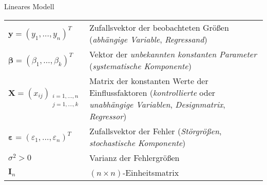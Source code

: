 \begin{defi}{Lineares Modell}
    \begin{tabularx}{\linewidth}{lX}
        $\mathbf{y} = (y_1, \ldots, y_n)^T$                                     & Zufallsvektor der beobachteten Größen (\emph{abhängige Variable}, \emph{Regressand})  \\
        ${\boldsymbol{\beta}} = (\beta_1, \ldots, \beta_k)^T$                   & Vektor der \emph{unbekannten konstanten Parameter}  (\emph{systematische Komponente}) \\
        $\mathbf{X} = (x_{ij})_{\substack{i = 1, \ldots, n                                                                                                              \\j = 1, \ldots, k}}$ & Matrix der konstanten Werte der Einflussfaktoren (\emph{kontrollierte} oder \emph{unabhängige Variablen}, \emph{Designmatrix}, \emph{Regressor}) \\
        ${\boldsymbol{\varepsilon}} = (\varepsilon_1, \ldots, \varepsilon_n)^T$ & Zufallsvektor der Fehler (\emph{Störgrößen}, \emph{stochastische Komponente})         \\
        $\sigma^2 > 0$                                                          & Varianz der Fehlergrößen                                                              \\
        $\mathbf{I}_n$                                                          & $(n \times n)$-Einheitsmatrix                                                         \\
    \end{tabularx}
\end{defi}

